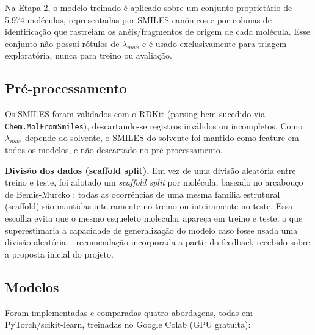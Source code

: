 \documentclass[12pt]{article}
\begin{document}
Na Etapa 2, o modelo treinado é aplicado sobre um conjunto proprietário de 5.974 moléculas,
representadas por SMILES canônicos e por colunas de identificação que rastreiam os
anéis/fragmentos de origem de cada molécula. Esse conjunto não possui rótulos de
$\lambda_{max}$ e é usado exclusivamente para triagem exploratória, nunca para treino ou
avaliação.

\subsection{Pré-processamento}

Os SMILES foram validados com o RDKit \cite{rdkit} (parsing bem-sucedido via
\texttt{Chem.MolFromSmiles}), descartando-se registros inválidos ou incompletos. Como
$\lambda_{max}$ depende do solvente, o SMILES do solvente foi mantido como feature em
todos os modelos, e não descartado no pré-processamento.

\textbf{Divisão dos dados (scaffold split).} Em vez de uma divisão aleatória entre treino
e teste, foi adotado um \emph{scaffold split} por molécula, baseado no arcabouço de
Bemis-Murcko \cite{bemis1996}: todas as ocorrências de uma mesma família estrutural
(scaffold) são mantidas inteiramente no treino ou inteiramente no teste. Essa escolha
evita que o mesmo esqueleto molecular apareça em treino e teste, o que superestimaria a
capacidade de generalização do modelo caso fosse usada uma divisão aleatória --
recomendação incorporada a partir do feedback recebido sobre a proposta inicial do
projeto.

\subsection{Modelos}

Foram implementadas e comparadas quatro abordagens, todas em PyTorch/scikit-learn,
treinadas no Google Colab (GPU gratuita):
\end{document}
